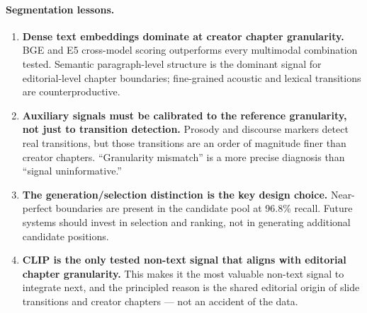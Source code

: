 \paragraph{Segmentation lessons.}
\begin{enumerate}
  \item \textbf{Dense text embeddings dominate at creator chapter granularity.}
    BGE and E5 cross-model scoring outperforms every multimodal combination
    tested.
    Semantic paragraph-level structure is the dominant signal for
    editorial-level chapter boundaries; fine-grained acoustic and lexical
    transitions are counterproductive.

  \item \textbf{Auxiliary signals must be calibrated to the reference
    granularity, not just to transition detection.}
    Prosody and discourse markers detect real transitions, but those transitions
    are an order of magnitude finer than creator chapters.
    ``Granularity mismatch'' is a more precise diagnosis than
    ``signal uninformative.''

  \item \textbf{The generation/selection distinction is the key design choice.}
    Near-perfect boundaries are present in the candidate pool at 96.8\% recall.
    Future systems should invest in selection and ranking, not in generating
    additional candidate positions.

  \item \textbf{CLIP is the only tested non-text signal that aligns with
    editorial chapter granularity.}
    This makes it the most valuable non-text signal to integrate next, and the
    principled reason is the shared editorial origin of slide transitions and
    creator chapters --- not an accident of the data.
\end{enumerate}


